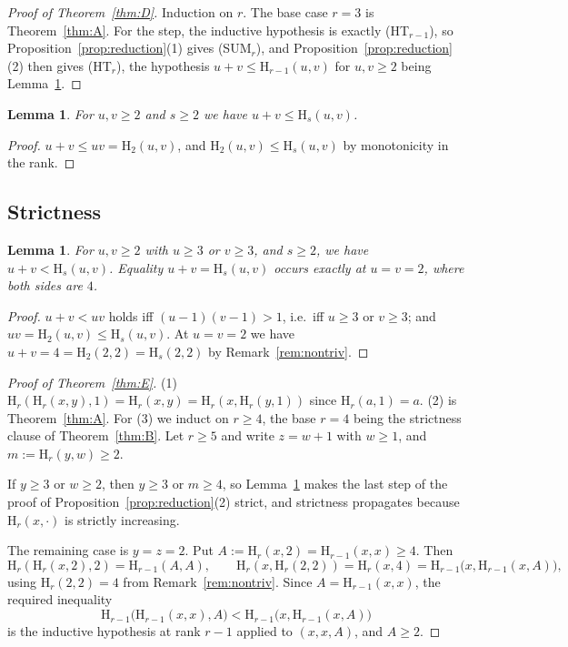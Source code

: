 \documentclass[11pt,a4paper]{article}
\theoremstyle{plain}
\newtheorem{lemma}[theorem]{Lemma}
\theoremstyle{definition}
\newcommand{\HH}{\mathrm{H}}
\begin{document}
\begin{proof}[Proof of Theorem~\ref{thm:D}]
Induction on $r$. The base case $r=3$ is Theorem~\ref{thm:A}. For the step, the
inductive hypothesis is exactly (HT$_{r-1}$), so Proposition~\ref{prop:reduction}(1)
gives (SUM$_r$), and Proposition~\ref{prop:reduction}(2) then gives (HT$_r$), the
hypothesis $u+v\le\HH_{r-1}(u,v)$ for $u,v\ge2$ being Lemma~\ref{lem:add}.
\end{proof}

\begin{lemma}\label{lem:add}
For $u,v\ge2$ and $s\ge2$ we have $u+v\le\HH_s(u,v)$.
\end{lemma}

\begin{proof}
$u+v\le uv=\HH_2(u,v)$, and $\HH_2(u,v)\le\HH_s(u,v)$ by monotonicity in the rank.
\end{proof}

\subsection{Strictness}

\begin{lemma}\label{lem:addstrict}
For $u,v\ge2$ with $u\ge3$ or $v\ge3$, and $s\ge2$, we have $u+v<\HH_s(u,v)$.
Equality $u+v=\HH_s(u,v)$ occurs exactly at $u=v=2$, where both sides are $4$.
\end{lemma}

\begin{proof}
$u+v<uv$ holds iff $(u-1)(v-1)>1$, i.e.\ iff $u\ge3$ or $v\ge3$; and
$uv=\HH_2(u,v)\le\HH_s(u,v)$. At $u=v=2$ we have $u+v=4=\HH_2(2,2)=\HH_s(2,2)$ by
Remark~\ref{rem:nontriv}.
\end{proof}

\begin{proof}[Proof of Theorem~\ref{thm:E}]
(1) $\HH_r(\HH_r(x,y),1)=\HH_r(x,y)=\HH_r(x,\HH_r(y,1))$ since $\HH_r(a,1)=a$.
(2) is Theorem~\ref{thm:A}.
For (3) we induct on $r\ge4$, the base $r=4$ being the strictness clause of
Theorem~\ref{thm:B}. Let $r\ge5$ and write $z=w+1$ with $w\ge1$, and
$m:=\HH_r(y,w)\ge2$.

If $y\ge3$ or $w\ge2$, then $y\ge3$ or $m\ge4$, so Lemma~\ref{lem:addstrict} makes
the last step of the proof of Proposition~\ref{prop:reduction}(2) strict, and
strictness propagates because $\HH_r(x,\cdot)$ is strictly increasing.

The remaining case is $y=z=2$. Put $A:=\HH_r(x,2)=\HH_{r-1}(x,x)\ge4$. Then
\[
  \HH_r(\HH_r(x,2),2)=\HH_{r-1}(A,A),
  \qquad
  \HH_r(x,\HH_r(2,2))=\HH_r(x,4)=\HH_{r-1}\bigl(x,\HH_{r-1}(x,A)\bigr),
\]
using $\HH_r(2,2)=4$ from Remark~\ref{rem:nontriv}. Since $A=\HH_{r-1}(x,x)$, the
required inequality
\[
\HH_{r-1}\bigl(\HH_{r-1}(x,x),A\bigr)<\HH_{r-1}\bigl(x,\HH_{r-1}(x,A)\bigr)
\]
is the inductive hypothesis at rank $r-1$ applied to $(x,x,A)$, and $A\ge2$.
\end{proof}
\end{document}

